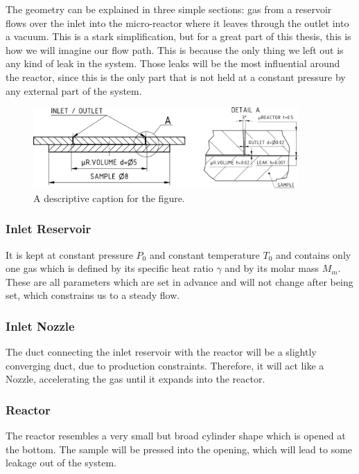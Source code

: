 	The geometry can be explained in three simple sections: gas from a reservoir flows over the inlet into the micro-reactor where it leaves through the outlet into a vacuum. 
	This is a stark simplification, but for a great part of this thesis, this is how we will imagine our flow path.
	This is because the only thing we left out is any kind of leak in the system.
	Those leaks will be the most influential around the reactor, since this is the only part that is not held at a constant pressure by any external part of the system.\\
	\begin{figure}[H]
	    \centering
	    \includegraphics[width=0.9\textwidth]{src/02_scope-and-objectives/fig_technical-drawing.png}
	    \caption{A descriptive caption for the figure.}
	    \label{fig:technical-drawing}
	\end{figure}
\subsubsection*{Inlet Reservoir}

	It is kept at constant pressure \(P_0\) and constant temperature \(T_0\) and contains only one gas which is defined by its specific heat ratio \(\gamma\) and by its molar mass \(M_m\).
	These are all parameters which are set in advance and will not change after being set, which constrains us to a steady flow.
	
\subsubsection*{Inlet Nozzle}

	The duct connecting the inlet reservoir with the reactor will be a slightly converging duct, due to production constraints.
	Therefore, it will act like a Nozzle, accelerating the gas until it expands into the reactor.
	
\subsubsection*{Reactor}
	
	The reactor resembles a very small but broad cylinder shape which is opened at the bottom.
	The sample will be pressed into the opening, which will lead to some leakage out of the system.
	
